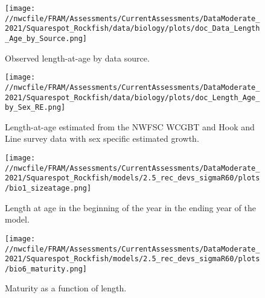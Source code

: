 \documentclass[11pt,
  english,
  a4paper,
]{article}
\begin{document}
\tagmcend\tagstructend


\begin{figure}
\centering
\texttt{[image: //nwcfile/FRAM/Assessments/CurrentAssessments/DataModerate\_2021/Squarespot\_Rockfish/data/biology/plots/doc\_Data\_Length\_Age\_by\_Source.png]}
\caption{Observed length-at-age by data source.\label{fig:len-age-data}}
\end{figure}

\tagmcend\tagstructend


\begin{figure}
\centering
\texttt{[image: //nwcfile/FRAM/Assessments/CurrentAssessments/DataModerate\_2021/Squarespot\_Rockfish/data/biology/plots/doc\_Length\_Age\_by\_Sex\_RE.png]}
\caption{Length-at-age estimated from the NWFSC WCGBT and Hook and Line survey data with sex specific estimated growth.\label{fig:len-age}}
\end{figure}

\tagmcend\tagstructend


\begin{figure}
\centering
\texttt{[image: //nwcfile/FRAM/Assessments/CurrentAssessments/DataModerate\_2021/Squarespot\_Rockfish/models/2.5\_rec\_devs\_sigmaR60/plots/bio1\_sizeatage.png]}
\caption{Length at age in the beginning of the year in the ending year of the model.\label{fig:len-age-ss}}
\end{figure}

\tagmcend\tagstructend


\begin{figure}
\centering
\texttt{[image: //nwcfile/FRAM/Assessments/CurrentAssessments/DataModerate\_2021/Squarespot\_Rockfish/models/2.5\_rec\_devs\_sigmaR60/plots/bio6\_maturity.png]}
\caption{Maturity as a function of length.\label{fig:maturity}}
\end{figure}
\end{document}
